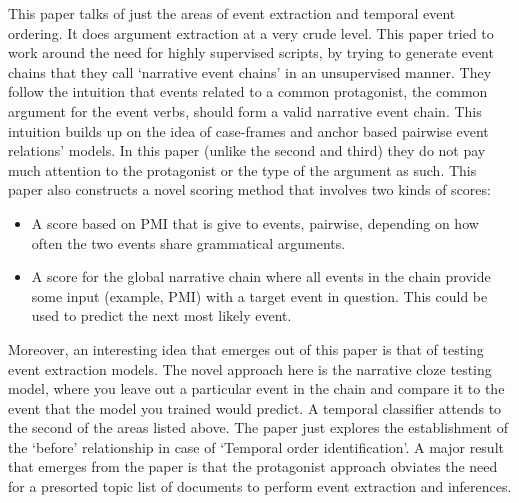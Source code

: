 
This paper talks of just the areas of event extraction and temporal event ordering. It does argument extraction at a very crude level. This paper tried to work around the need for highly supervised scripts, by trying to generate event chains that they call ‘narrative event chains’ in an unsupervised manner. They follow the intuition that events related to a common protagonist, the common argument for the event verbs, should form a valid narrative event chain. This intuition builds up on the idea of case-frames and anchor based pairwise event relations’ models. In this paper (unlike the second and third) they do not pay much attention to the protagonist or the type of the argument as such. This paper also constructs a novel scoring method that involves two kinds of scores: 
\begin{itemize}
\item A score based on PMI that is give to events, pairwise, depending on how often the two events share
grammatical arguments. 
\item A score for the global narrative chain where all events in the chain provide some input (example, PMI) with a target event in question. This could be
used to predict the next most likely event. 
\end{itemize}
Moreover, an interesting idea that emerges out of this paper is that of testing event extraction models. The novel approach here is the narrative cloze testing model, where you leave out a particular event in the chain and compare it to the event that the model you trained would predict. A temporal classifier attends to the second of the areas listed above. The paper just explores the establishment
of the ‘before’ relationship in case of ‘Temporal order identification’. A major result that emerges from the paper is that the protagonist approach obviates the need for a presorted topic list of documents to perform event extraction and inferences.


